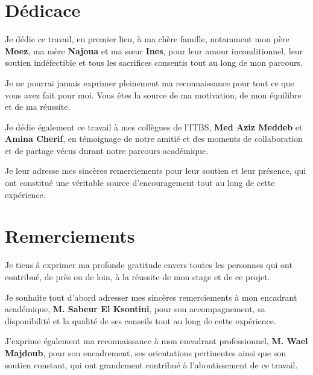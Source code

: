 \documentclass[a4paper, oneside, 12pt, final]{extreport}
\begin{document}
\chapter*{Dédicace}
\thispagestyle{empty}

\vspace{1cm}

Je dédie ce travail, en premier lieu, à ma chère famille, notamment mon père \textbf{Moez}, ma mère \textbf{Najoua} et ma sœur \textbf{Ines}, pour leur amour inconditionnel, leur soutien indéfectible et tous les sacrifices consentis tout au long de mon parcours.

\vspace{0.5cm}

Je ne pourrai jamais exprimer pleinement ma reconnaissance pour tout ce que vous avez fait pour moi. Vous êtes la source de ma motivation, de mon équilibre et de ma réussite.

\vspace{1cm}

Je dédie également ce travail à mes collègues de l’ITBS, \textbf{Med Aziz Meddeb} et \textbf{Amina Cherif}, en témoignage de notre amitié et des moments de collaboration et de partage vécus durant notre parcours académique.

\vspace{0.5cm}

Je leur adresse mes sincères remerciements pour leur soutien et leur présence, qui ont constitué une véritable source d’encouragement tout au long de cette expérience.
\chapter*{Remerciements}
\thispagestyle{empty}

\vspace{1cm}

Je tiens à exprimer ma profonde gratitude envers toutes les personnes qui ont contribué, de près ou de loin, à la réussite de mon stage et de ce projet.

\vspace{0.5cm}

Je souhaite tout d’abord adresser mes sincères remerciements à mon encadrant académique, \textbf{M. Sabeur El Ksontini}, pour son accompagnement, sa disponibilité et la qualité de ses conseils tout au long de cette expérience.

\vspace{0.5cm}

J’exprime également ma reconnaissance à mon encadrant professionnel, \textbf{M. Wael Majdoub}, pour son encadrement, ses orientations pertinentes ainsi que son soutien constant, qui ont grandement contribué à l’aboutissement de ce travail.
\end{document}
